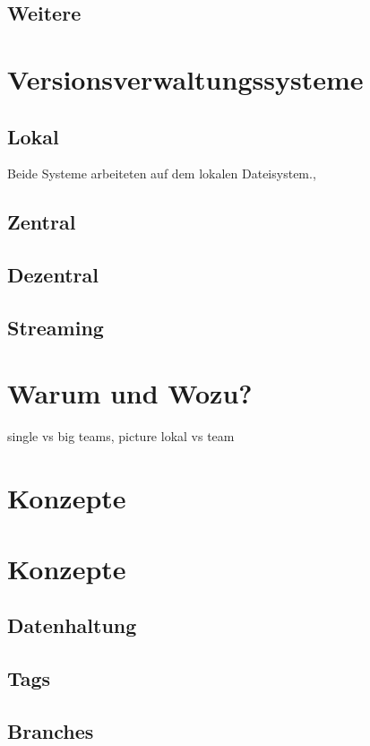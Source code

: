 \subsection{Weitere}
\section{Versionsverwaltungssysteme}
\subsection{Lokal}
Beide Systeme arbeiteten auf dem lokalen
Dateisystem.,
\subsection{Zentral}
\subsection{Dezentral}
\subsection{Streaming}
\section{Warum und Wozu?}
single vs big teams, picture lokal vs team
\label{sec:why}
\section{Konzepte}
\label{sec:systems}
\section{Konzepte}
\label{sec:Konzepte}
\subsection{Datenhaltung}
\label{sec:Datenhaltung}
\subsection{Tags}
\label{sec:Tags}
\subsection{Branches}
\label{sec:Branches}
